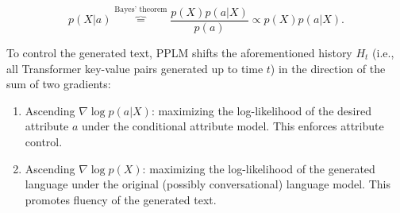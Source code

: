 \begin{equation}
    p(X | a) \overbrace{=}^{\text{Bayes' theorem}} 
    \frac{p(X) p(a | X)}{p(a)} \propto
    p(X)p(a | X).
\end{equation}


To control the generated text, PPLM shifts the aforementioned history $H_t$ (i.e., all Transformer key-value pairs generated up to time $t$) in the direction of the sum of two gradients:

\begin{enumerate}
    \item Ascending $\nabla \log p(a | X)$: maximizing the log-likelihood of the desired attribute $a$ under the conditional attribute model. This enforces attribute control.
    \item Ascending $\nabla \log p(X)$: maximizing the log-likelihood of the generated language under the original (possibly conversational) language model. This promotes fluency of the generated text.
\end{enumerate}

